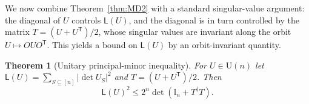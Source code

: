 \documentclass[prx,twocolumn,superscriptaddress,aps,10pt, frontmatterverbose, reprint,footinbib,longbibliography=true]{revtex4-2}
\newtheorem{theorem}{Theorem}
\newcommand{\trans}{\mathsf{T}}
\begin{document}
We now combine Theorem~\ref{thm:MD2} with a standard singular-value argument: the diagonal of $U$ controls $\mathsf{L}(U)$, and the diagonal is in turn controlled by the matrix $T=(U+U^{\trans})/2$, whose singular values are invariant along the orbit $U\mapsto OUO^{\trans}$. This yields a bound on $\mathsf{L}(U)$ by an orbit-invariant quantity.

\begin{theorem}[Unitary principal-minor inequality]
\label{thm:UL}
For $U\in \mathrm{U}(n)$ let $\mathsf{L}(U)=\sum_{S\subseteq[n]}|\det U_S|^2$ and $T=(U+U^{\trans})/2$. Then
\begin{equation}
    \mathsf{L}(U)^2\le 2^n\det\!\left(\mathbb{I}_n+T^\dagger T\right).
    \label{eq:UL}
\end{equation}
\end{theorem}
\end{document}
